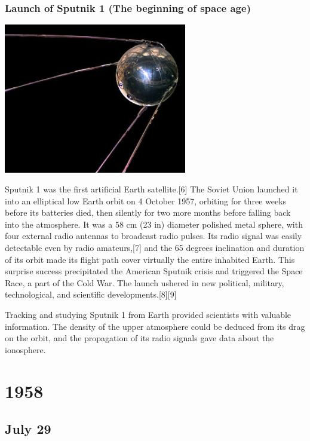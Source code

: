 \documentclass[11pt]{report}
\begin{document}
\subsection{Launch of Sputnik 1 (The beginning of space age)}
\vspace{2mm}\begin{center}\includegraphics[width=8cm]{./img/sputnik1.jpg}\end{center}
Sputnik 1 was the first artificial Earth satellite.[6] The Soviet Union launched it into an elliptical low Earth orbit on 4 October 1957, orbiting for three weeks before its batteries died, then silently for two more months before falling back into the atmosphere. It was a 58 cm (23 in) diameter polished metal sphere, with four external radio antennas to broadcast radio pulses. Its radio signal was easily detectable even by radio amateurs,[7] and the 65 degrees inclination and duration of its orbit made its flight path cover virtually the entire inhabited Earth. This surprise success precipitated the American Sputnik crisis and triggered the Space Race, a part of the Cold War. The launch ushered in new political, military, technological, and scientific developments.[8][9]

Tracking and studying Sputnik 1 from Earth provided scientists with valuable information. The density of the upper atmosphere could be deduced from its drag on the orbit, and the propagation of its radio signals gave data about the ionosphere.

\chapter{1958}
\section{July 29}
\end{document}

